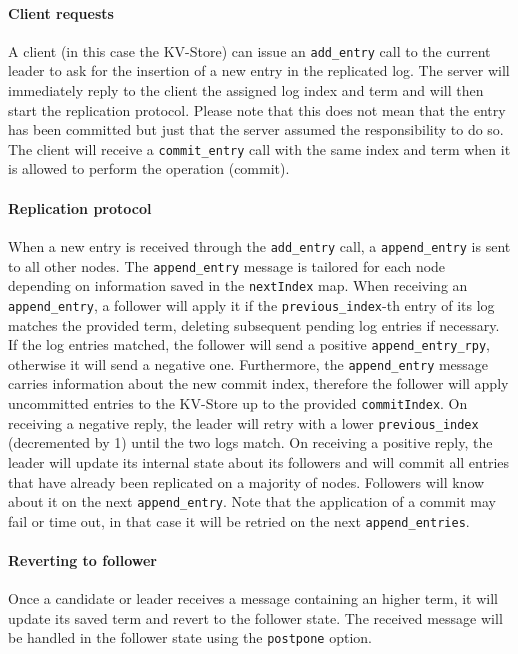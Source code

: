 \documentclass[a4paper]{article}
\begin{document}
\paragraph{Client requests}
A client (in this case the KV-Store) can issue an \texttt{add\_entry} call to 
the current leader to ask for the insertion of a new entry in the replicated 
log. The server will immediately reply to the client the assigned log index and 
term and will then start the replication protocol. Please note that this 
does not mean that the entry has been committed but just that the server 
assumed the responsibility to do so. The client will receive a
\texttt{commit\_entry} call with the same index and term when it is allowed 
to perform the operation (commit).

\paragraph{Replication protocol}
When a new entry is received through the \texttt{add\_entry} call, a 
\texttt{append\_entry} is sent to all other nodes. The \texttt{append\_entry}
message is tailored for each node depending on information saved in the 
\texttt{nextIndex} map. When receiving an \texttt{append\_entry}, a follower 
will apply it if the \texttt{previous\_index}-th entry of its log matches 
the provided term, deleting subsequent pending log entries if necessary.
If the log entries matched, the follower will send a positive 
\texttt{append\_entry\_rpy}, otherwise it will send a negative one. 
Furthermore, the \texttt{append\_entry} message carries information about the 
new commit index, therefore the follower will apply uncommitted entries to 
the KV-Store up to the provided \texttt{commitIndex}. 
On receiving a negative reply, the leader will retry with a lower 
\texttt{previous\_index} (decremented by 1) until the two logs match.
On receiving a positive reply, the leader will update its internal state about 
its followers and will commit all entries that have already been replicated 
on a majority of nodes. Followers will know about it on the next 
\texttt{append\_entry}.
Note that the application of a commit may fail or time out, in that case it 
will be retried on the next \texttt{append\_entries}.

\paragraph{Reverting to follower}
Once a candidate or leader receives a message containing an higher term, 
it will update its saved term and revert to the follower state. The received 
message will be handled in the follower state using the \texttt{postpone} 
option.
\end{document}
